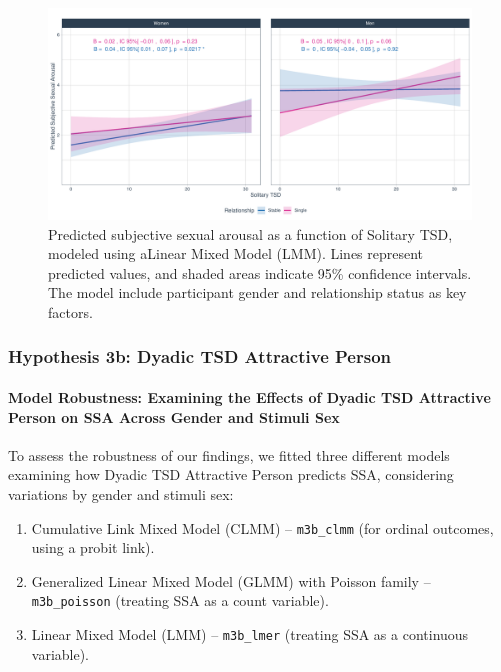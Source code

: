 \documentclass[
  bookmarksnumbered]{article}
\providecommand{\tightlist}{%
  \setlength{\itemsep}{0pt}\setlength{\parskip}{0pt}}
\begin{document}
\begin{figure}
\centering
\includegraphics{Sexual_Desire_Arousal_files/figure-latex/fig-h3a-1.pdf}
\caption{\label{fig:fig-h3a}Predicted subjective sexual arousal as a function of Solitary TSD, modeled using aLinear Mixed Model (LMM). Lines represent predicted values, and shaded areas indicate 95\% confidence intervals. The model include participant gender and relationship status as key factors.}
\end{figure}

\subsubsection{Hypothesis 3b: Dyadic TSD Attractive Person}\label{hyp3b}

\paragraph{Model Robustness: Examining the Effects of Dyadic TSD Attractive Person on SSA Across Gender and Stimuli Sex}\label{model-robustness-examining-the-effects-of-dyadic-tsd-attractive-person-on-ssa-across-gender-and-stimuli-sex-1}

To assess the robustness of our findings, we fitted three different models examining how Dyadic TSD Attractive Person predicts SSA, considering variations by gender and stimuli sex:

\begin{enumerate}
\def\labelenumi{\arabic{enumi}.}
\tightlist
\item
  Cumulative Link Mixed Model (CLMM) -- \texttt{m3b\_clmm} (for ordinal outcomes, using a probit link).
\item
  Generalized Linear Mixed Model (GLMM) with Poisson family -- \texttt{m3b\_poisson} (treating SSA as a count variable).
\item
  Linear Mixed Model (LMM) -- \texttt{m3b\_lmer} (treating SSA as a continuous variable).
\end{enumerate}
\end{document}
